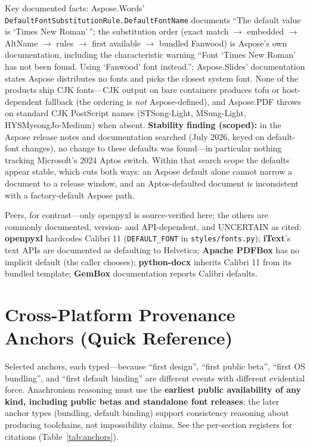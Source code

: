 \documentclass[10pt,a4paper]{article}
\newcommand{\code}[1]{\texttt{#1}}
\begin{document}
Key documented facts: Aspose.Words' \code{DefaultFont\allowbreak{}Substitution\allowbreak{}Rule.\allowbreak{}Default\allowbreak{}FontName}
documents ``The default value is `Times New Roman'\,''; the substitution order (exact
match $\rightarrow$ embedded $\rightarrow$ AltName $\rightarrow$ rules $\rightarrow$ first
available $\rightarrow$ bundled Fanwood) is Aspose's own documentation, including the
characteristic warning ``Font `Times New Roman' has not been found. Using `Fanwood' font
instead.''; Aspose.Slides' documentation states Aspose distributes no fonts and picks the
closest system font. None of the products ship CJK fonts---CJK output on bare containers
produces tofu or host-dependent fallback (the ordering is \emph{not} Aspose-defined), and
Aspose.PDF throws on standard CJK PostScript names (STSong-Light, MSung-Light,
HYSMyeongJo-Medium) when absent. \textbf{Stability finding (scoped):} in the Aspose
release notes and documentation searched (July 2026, keyed on default-font changes), no
change to these defaults was found---in particular nothing tracking Microsoft's 2024 Aptos
switch. Within that search scope the defaults appear stable, which cuts both ways: an
Aspose default alone cannot narrow a document to a release window, and an Aptos-defaulted
document is inconsistent with a factory-default Aspose
path.\cite{as-words,as-words-2,as-words-3,as-cells,as-slides,as-pdf}

Peers, for contrast---only openpyxl is source-verified here; the others are commonly
documented, version- and API-dependent, and UNCERTAIN as cited: \textbf{openpyxl}
hardcodes Calibri 11 (\code{DEFAULT\_FONT} in \code{styles/fonts.py}); \textbf{iText}'s
text APIs are documented as defaulting to Helvetica; \textbf{Apache PDFBox} has no
implicit default (the caller chooses); \textbf{python-docx} inherits Calibri 11 from
its bundled template; \textbf{GemBox} documentation reports Calibri defaults.\cite{as-peers}

\section{Cross-Platform Provenance Anchors (Quick Reference)}\label{sec:anchors}

Selected anchors, each typed---because ``first design'', ``first public beta'', ``first
OS bundling'', and ``first default binding'' are different events with different
evidential force. Anachronism reasoning must use the \textbf{earliest public availability
of any kind, including public betas and standalone font releases}; the later anchor types
(bundling, default binding) support consistency reasoning about producing toolchains, not
impossibility claims. See the per-section registers for citations (Table~\ref{tab:anchors}).
\end{document}
